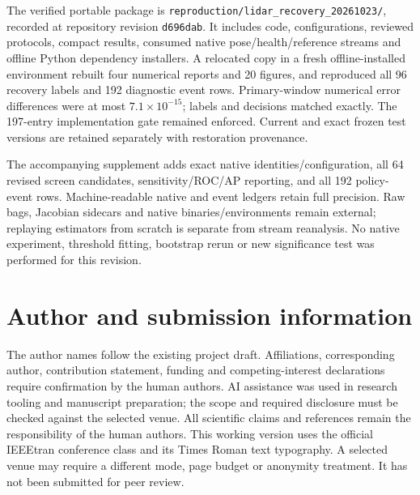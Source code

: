 \documentclass[conference]{IEEEtran}
\begin{document}
The verified portable package is
\texttt{reproduction/lidar\_recovery\_20261023/}, recorded at repository
revision \texttt{d696dab}. It includes code, configurations, reviewed
protocols, compact results, consumed native pose/health/reference streams
and offline Python dependency installers. A relocated copy in a fresh
offline-installed environment rebuilt four numerical reports and 20 figures,
and reproduced all 96 recovery labels and 192 diagnostic event rows.
Primary-window numerical error differences were at most
$7.1\times10^{-15}$; labels and decisions matched exactly. The 197-entry
implementation gate remained enforced. Current and exact frozen test
versions are retained separately with restoration provenance.

The accompanying supplement adds exact native identities/configuration,
all 64 revised screen candidates, sensitivity/ROC/AP reporting, and all
192 policy-event rows. Machine-readable native and event ledgers retain
full precision. Raw bags, Jacobian sidecars and native binaries/environments
remain external; replaying estimators from scratch is separate from stream
reanalysis. No native experiment, threshold fitting, bootstrap rerun or new
significance test was performed for this revision.

\section*{Author and submission information}
The author names follow the existing project draft. Affiliations,
corresponding author, contribution statement, funding and competing-interest
declarations require confirmation by the human authors. AI assistance was
used in research tooling and manuscript preparation; the scope and required
disclosure must be checked against the selected venue. All scientific
claims and references remain the responsibility of the human authors.
This working version uses the official IEEEtran conference class and its
Times Roman text typography. A selected venue may require a different mode,
page budget or anonymity treatment. It has not been submitted for peer review.
\end{document}
